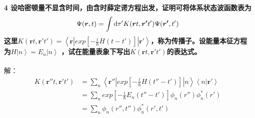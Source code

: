 \documentclass[12pt]{article}
\numberwithin{equation}{section}	 %
\begin{document}
\begin{spacing}{1.5}
\textbf{4 \quad 设哈密顿量不显含时间，由含时薛定谔方程出发，证明可将体系状态波函数表为
\begin{equation}\nonumber 		%
\Psi(\bm{r},t) = \int\dif\tau'K(\bm{r}t,\bm{r'}t')\Psi(\bm{r'},t')
\end{equation}
这里$\displaystyle K(\bm{r}t,\bm{r'}t') = \left<\bm{r}\left|exp\left[-\frac{i}{\hbar}H(t-t')\right]\right|\bm{r'}\right>$，称为传播子。设能量本征方程为$H\left|n\right>=E_{n}\left|n\right>$
，试在能量表象下写出$K(\bm{r}t,\bm{r'}t')$的表达式。}\\
~\\
解：
\begin{align*}
K(\bm{r''}t,\bm{r'}t') &= \sum_{n}\left<\bm{r''}\left|exp\left[-\frac{i}{\hbar}H(t''-t')\right]\right|n\right>\left<n\bigg|\bm{r'}\right> \\
&= \sum_{n} exp\left[-\frac{i}{\hbar}E_{n}(t''-t')\right]\phi_{n}(r'')\phi^{*}_{n}(r')\\
&= \sum_{n} \phi_{n}(r'',t'')\phi^{*}_{n}(r',t')\\
\end{align*}
~\\
~\\

\newpage

\end{spacing}
\end{document}
